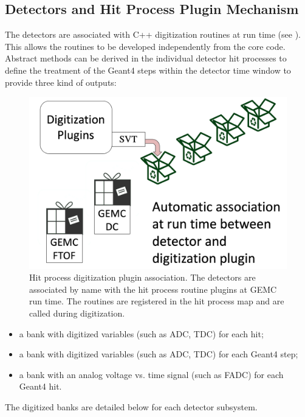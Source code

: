 \subsection{Detectors and Hit Process Plugin Mechanism}

The detectors are associated with C++ digitization routines at run time (see ).
This allows the routines to be developed independently from the core code. Abstract methods can be derived in
the individual detector hit processes to define the treatment of the Geant4 steps within the detector
time window to provide three kind of outputs:

\begin{figure}
	\centering
	\includegraphics[width=1.0\columnwidth,keepaspectratio]{img/pluginsAssociation.png}
	\caption{Hit process digitization plugin association. The detectors are associated by name with the hit process routine
             plugins at GEMC run time. The routines are registered in the hit process map and are called during digitization.}
	\label{fig:pluginsAssociation}
\end{figure}

\begin{itemize}
	\item a bank with digitized variables (such as ADC, TDC) for each hit;
	\item a bank with digitized variables (such as ADC, TDC) for each Geant4 step;
	\item a bank with an analog voltage vs. time signal (such as FADC) for each Geant4 hit.
\end{itemize}

The digitized banks are detailed below for each detector subsystem.

